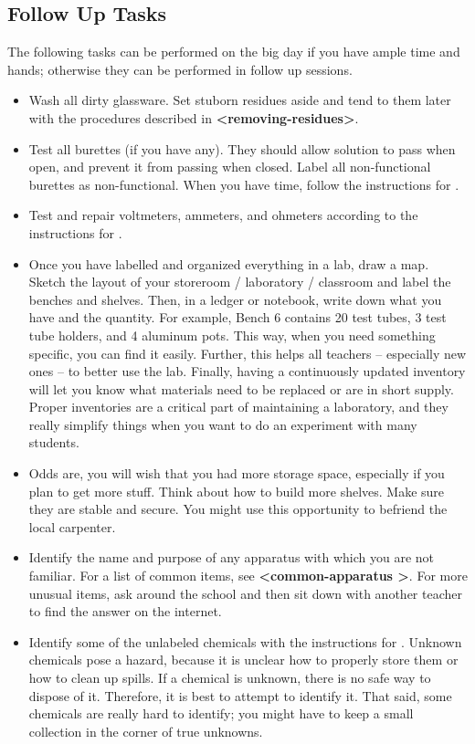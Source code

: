 \subsection{Follow Up Tasks}

The following tasks can be performed on the big day if you have ample time and hands; otherwise they can be performed in follow up sessions.

\begin{itemize}
\item{Wash all dirty glassware. Set stuborn residues aside and tend to them later with the procedures described in \textbf{\textless removing-residues\textgreater }.}
\item{Test all burettes (if you have any). They should allow solution to pass when open, and prevent it from passing when closed. Label all non-functional burettes as non-functional. When you have time, follow the instructions for .}
\item{Test and repair voltmeters, ammeters, and ohmeters according to the instructions for .}
\item{Once you have labelled and organized everything in a lab, draw a map. Sketch the layout of your storeroom / laboratory / classroom and label the benches and shelves. Then, in a ledger or notebook, 
write down what you have and the quantity. For example, Bench 6 contains 20 test tubes, 3 test tube holders, and 4 aluminum pots. This way, when you need something specific, you can find it easily. Further, 
this helps all teachers -- especially new ones -- to better use the lab. Finally, having a continuously updated inventory will let you know what materials need to be replaced or are in short supply. Proper inventories are a critical part of maintaining a laboratory, and they really simplify things when you want to do an experiment with many students.}
\item{Odds are, you will wish that you had more storage space, especially if you plan to get more stuff. Think about how to build more shelves. Make sure they are stable and secure. You might use this opportunity to befriend the local carpenter.}
\item{Identify the name and purpose of any apparatus with which you are not familiar. For a list of common items, see \textbf{\textless common-apparatus \textgreater}. For more unusual items, ask around the school and then sit down with another teacher to find the answer on the internet.}
\item{Identify some of the unlabeled chemicals with the instructions for . Unknown chemicals pose a hazard, because it is unclear how to properly store them or how to clean up spills. If a chemical is unknown, there is no safe way to dispose of it. Therefore, it is best to attempt to identify it. That said, some chemicals are really hard to identify; you might have to keep a small collection in the corner of true unknowns.}
\end{itemize}


